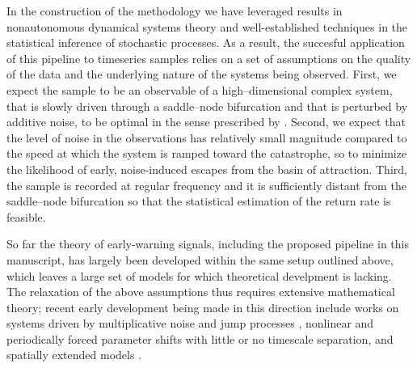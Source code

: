 \documentclass[openacc]{rsproca_new}
\begin{document}
In the construction of the methodology we have leveraged results in nonautonomous dynamical systems theory and well-established techniques in the statistical inference of stochastic processes.
As a result, the succesful application of this pipeline to timeseries samples relies on a set of assumptions on the quality of the data and the underlying nature of the systems being observed.
First, we expect the sample to be an observable of a high--dimensional complex system, that is slowly driven through a saddle--node bifurcation and that is perturbed by additive noise, to be optimal in the sense prescribed by \cite{Lohmann2025b,Ditlevsen2026}.
Second, we expect that the level of noise in the observations has relatively small magnitude compared to the speed at which the system is ramped toward the catastrophe, so to minimize the likelihood of early, noise-induced escapes from the basin of attraction.
Third, the sample is recorded at regular frequency and it is sufficiently distant from the saddle--node bifurcation so that the statistical estimation of the return rate is feasible.

So far the theory of early-warning signals, including the proposed pipeline in this manuscript, has largely been developed within the same setup outlined above, which leaves a large set of models for which theoretical develpment is lacking.
The relaxation of the above assumptions thus requires extensive mathematical theory; recent early development being made in this direction include works on systems driven by multiplicative noise \cite{Morr2024b} and jump processes \cite{Layritz2025}, nonlinear \cite{Ritchie2016} and periodically forced \cite{Kuehn2018} parameter shifts with little or no timescale separation, and spatially extended models \cite{Gowda2015,Bernuzzi2024,Clarke2026,Miyauchi2026}.


\vskip6pt
\enlargethispage{20pt}

\end{document}
